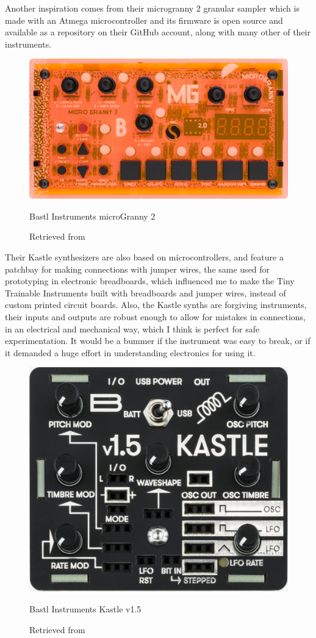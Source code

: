Another inspiration comes from their microgranny 2 granular sampler which is made with an Atmega microcontroller and its firmware is open source and available as a repository on their GitHub account, along with many other of their instruments.

\begin{figure}[ht]
  \centering
  \includegraphics[width=0.75\linewidth,height=0.25\textheight,keepaspectratio]{images/bastl-microgranny-2.jpg}
  \caption{Bastl Instruments microGranny 2}
  \caption*{Retrieved from \cite{website-bastl-instruments-current}}
  \label{fig:bastl-microgranny-2}
\end{figure}

Their Kastle synthesizers are also based on microcontrollers, and feature a patchbay for making connections with jumper wires, the same used for prototyping in electronic breadboards, which influenced me to make the Tiny Trainable Instruments built with breadboards and jumper wires, instead of custom printed circuit boards. Also, the Kastle synths are forgiving instruments, their inputs and outputs are robust enough to allow for mistakes in connections, in an electrical and mechanical way, which I think is perfect for safe experimentation. It would be a bummer if the instrument was easy to break, or if it demanded a huge effort in understanding electronics for using it.

\begin{figure}[ht]
  \centering
  \includegraphics[width=0.75\linewidth,height=0.25\textheight,keepaspectratio]{images/bastl-kastle-v15.jpg}
  \caption{Bastl Instruments Kastle v1.5}
  \caption*{Retrieved from \cite{website-bastl-instruments-current}}
  \label{fig:bastl-kastle-v15}
\end{figure}


